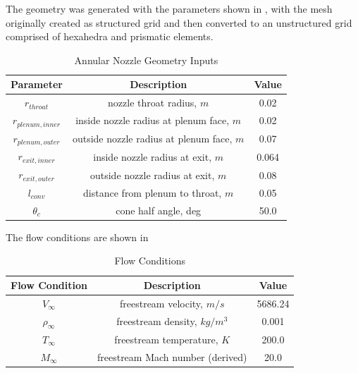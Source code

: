 The geometry was generated with the parameters shown in ,
with the mesh originally created as structured grid and then converted to an
unstructured grid comprised of hexahedra and prismatic elements.
\begin{table}[h]
  \centering
  \begin{tabular}{c|c|c}
    Parameter & Description & Value \\
    \hline
    $r_{throat}$       &   nozzle throat radius, $m$                 & 0.02 \\
    $r_{plenum,inner}$ &   inside nozzle radius at plenum face, $m$  & 0.02 \\
    $r_{plenum,outer}$ &   outside nozzle radius at plenum face, $m$ & 0.07 \\
    $r_{exit,inner}$   &   inside nozzle radius at exit, $m$         & 0.064 \\
    $r_{exit,outer}$   &   outside nozzle radius at exit, $m$        & 0.08 \\
    $l_{conv}$         &   distance from plenum to throat, $m$       & 0.05 \\
    $\theta_c$         &   cone half angle, deg                      & 50.0
  \end{tabular}
  \caption{Annular Nozzle Geometry Inputs}
  \label{tab:annular-geom}
\end{table}
The flow conditions are shown in 
\begin{table}[!h]
  \centering
  \begin{tabular}{c|c|c}
    Flow Condition & Description & Value \\
    \hline
    $V_{\infty}$    & freestream velocity, $m/s$        & 5686.24 \\
    $\rho_{\infty}$ & freestream density, $kg/m^3$      & 0.001 \\
    $T_{\infty}$    & freestream temperature, $K$       & 200.0 \\
    $M_{\infty}$    & freestream Mach number (derived)  & 20.0
  \end{tabular}
  \caption{Flow Conditions}
  \label{tab:flow-conditions}
\end{table}

